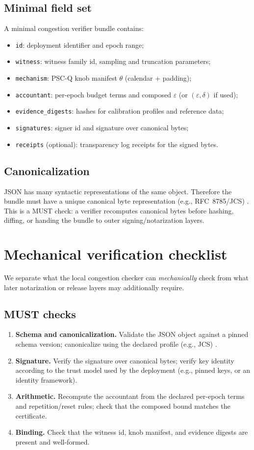 \documentclass[11pt]{article}
\newcommand{\eps}{\varepsilon}
\begin{document}
\subsection{Minimal field set}
A minimal congestion verifier bundle contains:
\begin{itemize}[leftmargin=1.2em]
\item \texttt{id}: deployment identifier and epoch range;
\item \texttt{witness}: witness family id, sampling and truncation parameters;
\item \texttt{mechanism}: PSC-Q knob manifest $\theta$ (calendar + padding);
\item \texttt{accountant}: per-epoch budget terms and composed $\eps$ (or $(\eps,\delta)$ if used);
\item \texttt{evidence\_digests}: hashes for calibration profiles and reference data;
\item \texttt{signatures}: signer id and signature over canonical bytes;
\item \texttt{receipts} (optional): transparency log receipts for the signed bytes.
\end{itemize}

\subsection{Canonicalization}
JSON has many syntactic representations of the same object.
Therefore the bundle must have a unique canonical byte representation (e.g., RFC~8785/JCS) \cite{rfc8785}.
This is a MUST check: a verifier recomputes canonical bytes before hashing, diffing, or handing the bundle to outer signing/notarization layers.

\section{Mechanical verification checklist}
We separate what the local congestion checker can \emph{mechanically} check from what later notarization or release layers may additionally require.

\subsection{MUST checks}
\begin{enumerate}[leftmargin=1.6em]
\item \textbf{Schema and canonicalization.} Validate the JSON object against a pinned schema version; canonicalize using the declared profile (e.g., JCS) \cite{rfc8785}.
\item \textbf{Signature.} Verify the signature over canonical bytes; verify key identity according to the trust model used by the deployment (e.g., pinned keys, or an identity framework).
\item \textbf{Arithmetic.} Recompute the accountant from the declared per-epoch terms and repetition/reset rules; check that the composed bound matches the certificate.
\item \textbf{Binding.} Check that the witness id, knob manifest, and evidence digests are present and well-formed.
\end{enumerate}
\end{document}
